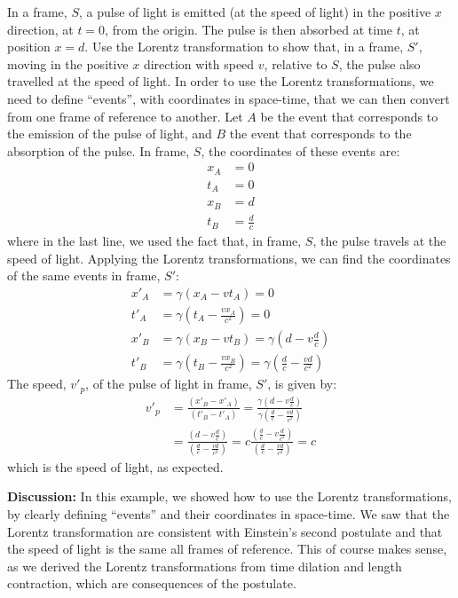 \begin{example}{In a frame, $S$, a pulse of light is emitted (at the speed of light) in the positive $x$ direction, at $t=0$, from the origin. The pulse is then absorbed at time $t$, at position $x=d$. Use the Lorentz transformation to show that, in a frame, $S'$, moving in the positive $x$ direction with speed $v$, relative to $S$, the pulse also travelled at the speed of light.}
In order to use the Lorentz transformations, we need to define ``events'', with coordinates in space-time, that we can then convert from one frame of reference to another. Let $A$ be the event that corresponds to the emission of the pulse of light, and $B$ the event that corresponds to the absorption of the pulse. In frame, $S$, the coordinates of these events are:
\begin{align*}
x_A&=0\\
t_A&=0\\
x_B&=d\\
t_B&=\frac{d}{c}
\end{align*}
where in the last line, we used the fact that, in frame, $S$, the pulse travels at the speed of light. Applying the Lorentz transformations, we can find the coordinates of the same events in frame, $S'$:
\begin{align*}
x'_A&=\gamma (x_A-vt_A)=0\\
t'_A&=\gamma\left(t_A-\frac{vx_A}{c^2} \right)=0\\
x'_B&=\gamma (x_B-vt_B)=\gamma \left(d-v\frac{d}{c}\right)\\
t'_B&=\gamma\left(t_B-\frac{vx_B}{c^2} \right)=\gamma\left(\frac{d}{c}-\frac{vd}{c^2} \right)
\end{align*} 
The speed, $v'_p$, of the pulse of light in frame, $S'$, is given by:
\begin{align*}
v'_p&=\frac{(x'_B-x'_A)}{(t'_B-t'_A)}=\frac{\gamma \left(d-v\frac{d}{c}\right)}{\gamma\left(\frac{d}{c}-\frac{vd}{c^2} \right)}\\
&=\frac{\left(d-v\frac{d}{c}\right)}{\left(\frac{d}{c}-\frac{vd}{c^2} \right)}=c\frac{\left(\frac{d}{c}-v\frac{d}{c^2}\right)}{\left(\frac{d}{c}-\frac{vd}{c^2} \right)}=c
\end{align*}
which is the speed of light, as expected. 

\textbf{Discussion: }In this example, we showed how to use the Lorentz transformations, by clearly defining ``events'' and their coordinates in space-time. We saw that the Lorentz transformation are consistent with Einstein's second postulate and that the speed of light is the same all frames of reference. This of course makes sense, as we derived the Lorentz transformations from time dilation and length contraction, which are consequences of the postulate.
\end{example}


